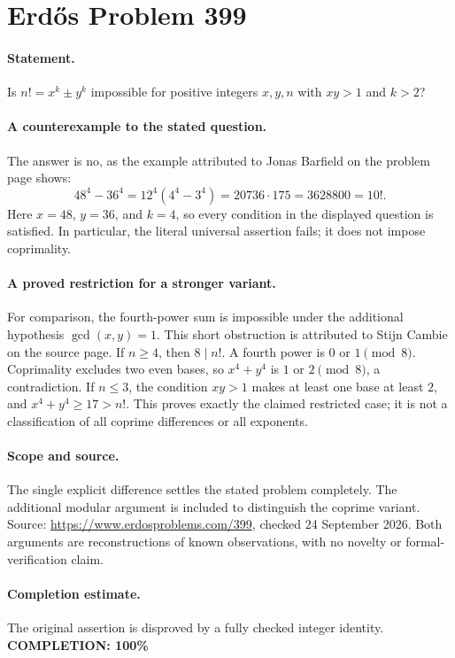 \section*{Erd\H{o}s Problem 399}

\paragraph{Statement.}
Is \(n!=x^k\pm y^k\) impossible for positive integers \(x,y,n\) with
\(xy>1\) and \(k>2\)?

\paragraph{A counterexample to the stated question.}
The answer is no, as the example attributed to Jonas Barfield on the
problem page shows:
\[
 48^4-36^4
 =12^4(4^4-3^4)
 =20736\cdot175
 =3628800
 =10!.
\]
Here \(x=48\), \(y=36\), and \(k=4\), so every condition in the displayed
question is satisfied. In particular, the literal universal assertion fails;
it does not impose coprimality.

\paragraph{A proved restriction for a stronger variant.}
For comparison, the fourth-power sum is impossible under the additional
hypothesis \(\gcd(x,y)=1\). This short obstruction is attributed to Stijn
Cambie on the source page. If \(n\geq4\), then \(8\mid n!\). A fourth
power is \(0\) or \(1\pmod8\). Coprimality excludes two even bases, so
\(x^4+y^4\) is \(1\) or \(2\pmod8\), a contradiction. If \(n\leq3\),
the condition \(xy>1\) makes at least one base at least \(2\), and
\(x^4+y^4\geq17>n!\). This proves exactly the claimed restricted case;
it is not a classification of all coprime differences or all exponents.

\paragraph{Scope and source.}
The single explicit difference settles the stated problem completely.
The additional modular argument is included to distinguish the coprime
variant. Source: \url{https://www.erdosproblems.com/399},
checked 24 September 2026. Both arguments are reconstructions of known
observations, with no novelty or formal-verification claim.

\paragraph{Completion estimate.}
The original assertion is disproved by a fully checked integer identity.
\textbf{COMPLETION: 100\%}
